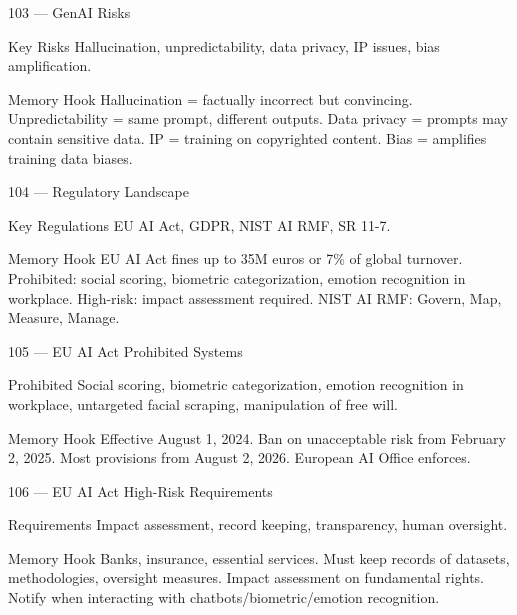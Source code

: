 \documentclass[aspectratio=169,8pt]{beamer}
\begin{document}
	\begin{frame}{103 --- GenAI Risks}
		\begin{block}{Key Risks}
			Hallucination, unpredictability, data privacy, IP issues, bias amplification.
		\end{block}
		\begin{block}{Memory Hook}
			Hallucination = factually incorrect but convincing. Unpredictability = same prompt, different outputs. Data privacy = prompts may contain sensitive data. IP = training on copyrighted content. Bias = amplifies training data biases.
		\end{block}
	\end{frame}
	
	\begin{frame}{104 --- Regulatory Landscape}
		\begin{block}{Key Regulations}
			EU AI Act, GDPR, NIST AI RMF, SR 11-7.
		\end{block}
		\begin{block}{Memory Hook}
			EU AI Act fines up to 35M euros or 7\% of global turnover. Prohibited: social scoring, biometric categorization, emotion recognition in workplace. High-risk: impact assessment required. NIST AI RMF: Govern, Map, Measure, Manage.
		\end{block}
	\end{frame}
	
	\begin{frame}{105 --- EU AI Act Prohibited Systems}
		\begin{block}{Prohibited}
			Social scoring, biometric categorization, emotion recognition in workplace, untargeted facial scraping, manipulation of free will.
		\end{block}
		\begin{block}{Memory Hook}
			Effective August 1, 2024. Ban on unacceptable risk from February 2, 2025. Most provisions from August 2, 2026. European AI Office enforces.
		\end{block}
	\end{frame}
	
	\begin{frame}{106 --- EU AI Act High-Risk Requirements}
		\begin{block}{Requirements}
			Impact assessment, record keeping, transparency, human oversight.
		\end{block}
		\begin{block}{Memory Hook}
			Banks, insurance, essential services. Must keep records of datasets, methodologies, oversight measures. Impact assessment on fundamental rights. Notify when interacting with chatbots/biometric/emotion recognition.
		\end{block}
	\end{frame}
	
\end{document}
